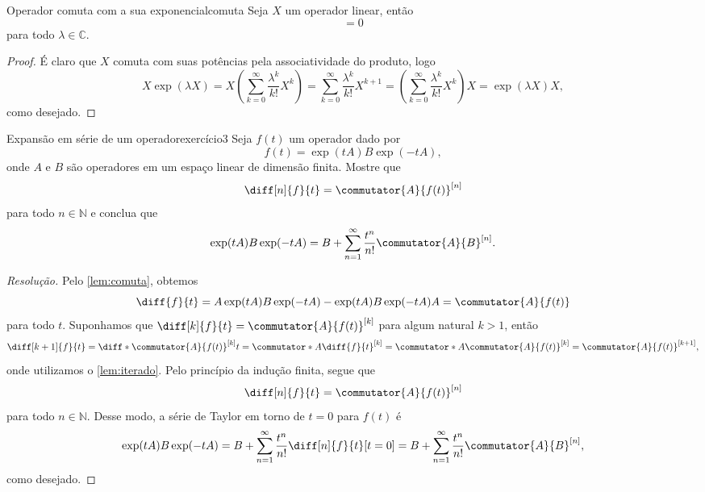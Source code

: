 \begin{lemma}{Operador comuta com a sua exponencial}{comuta}
    Seja \(X\) um operador linear, então
    \begin{equation*}
        [X, \exp(\lambda X)] = 0
    \end{equation*}
    para todo \(\lambda \in \mathbb{C}\).
\end{lemma}
\begin{proof}
    É claro que \(X\) comuta com suas potências pela associatividade do produto, logo
    \begin{equation*}
        X \exp(\lambda X) = X \left(\sum_{k=0}^\infty \frac{\lambda^k}{k!}X^k\right) = \sum_{k=0}^\infty \frac{\lambda^k}{k!}X^{k+1} = \left(\sum_{k=0}^\infty \frac{\lambda^k}{k!}X^k\right)X = \exp(\lambda X) X,
    \end{equation*}
    como desejado.
\end{proof}
\setcounter{tcb@cnt@exercício}{2}
\begin{exercício}{Expansão em série de um operador}{exercício3}
    Seja \(f(t)\) um operador dado por
    \begin{equation*}
        f(t) = \exp(tA) B\exp(-tA),
    \end{equation*}
    onde \(A\) e \(B\) são operadores em um espaço linear de dimensão finita. Mostre que
    \begin{equation*}
        \diff[n]{f}{t} = \commutator{A}{f(t)}^{[n]}
    \end{equation*}
    para todo \(n \in \mathbb{N}\) e conclua que
    \begin{equation*}
        \exp(tA)B\exp(-tA) = B + \sum_{n = 1}^\infty \frac{t^n}{n!}\commutator{A}{B}^{[n]}.
    \end{equation*}
\end{exercício}
\begin{proof}[Resolução]
    Pelo \cref{lem:comuta}, obtemos
    \begin{equation*}
        \diff{f}{t} = A \exp(tA) B\exp(-tA) - \exp(tA) B\exp(-tA) A = \commutator{A}{f(t)}
    \end{equation*}
    para todo \(t\). Suponhamos que \(\diff[k]{f}{t} = \commutator{A}{f(t)}^{[k]}\) para algum natural \(k > 1\), então
    \begin{equation*}
        \diff[k+1]{f}{t} = \diff*{\commutator{A}{f(t)}^{[k]}}{t} = \commutator*{A}{\diff{f}{t}}^{[k]} = \commutator*{A}{\commutator{A}{f(t)}}^{[k]} = \commutator{A}{f(t)}^{[k+1]},
    \end{equation*}
    onde utilizamos o \cref{lem:iterado}. Pelo princípio da indução finita, segue que
    \begin{equation*}
        \diff[n]{f}{t} = \commutator{A}{f(t)}^{[n]}
    \end{equation*}
    para todo \(n \in \mathbb{N}\). Desse modo, a série de Taylor em torno de \(t = 0\) para \(f(t)\) é
    \begin{equation*}
        \exp(tA)B\exp(-tA) = B + \sum_{n = 1}^{\infty} \frac{t^n}{n!}\diff[n]{f}{t}[t=0] = B + \sum_{n = 1}^{\infty} \frac{t^n}{n!}\commutator{A}{B}^{[n]},
    \end{equation*}
    como desejado.
\end{proof}
